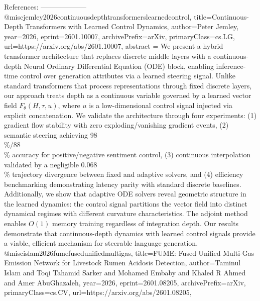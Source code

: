         References:
        --------------------
        @misc{jemley2026continuousdepthtransformerslearnedcontrol,
      title={Continuous-Depth Transformers with Learned Control Dynamics}, 
      author={Peter Jemley},
      year={2026},
      eprint={2601.10007},
      archivePrefix={arXiv},
      primaryClass={cs.LG},
      url={https://arxiv.org/abs/2601.10007},
      abstract = {We present a hybrid transformer architecture that replaces discrete middle layers with a continuous-depth Neural Ordinary Differential Equation (ODE) block, enabling inference-time control over generation attributes via a learned steering signal. Unlike standard transformers that process representations through fixed discrete layers, our approach treats depth as a continuous variable governed by a learned vector field $F_θ(H, τ, u)$, where $u$ is a low-dimensional control signal injected via explicit concatenation. We validate the architecture through four experiments: (1) gradient flow stability with zero exploding/vanishing gradient events, (2) semantic steering achieving 98\\\%/88\\\% accuracy for positive/negative sentiment control, (3) continuous interpolation validated by a negligible 0.068\\\% trajectory divergence between fixed and adaptive solvers, and (4) efficiency benchmarking demonstrating latency parity with standard discrete baselines. Additionally, we show that adaptive ODE solvers reveal geometric structure in the learned dynamics: the control signal partitions the vector field into distinct dynamical regimes with different curvature characteristics. The adjoint method enables $O(1)$ memory training regardless of integration depth. Our results demonstrate that continuous-depth dynamics with learned control signals provide a viable, efficient mechanism for steerable language generation.}
}@misc{islam2026fumefusedunifiedmultigas,
      title={FUME: Fused Unified Multi-Gas Emission Network for Livestock Rumen Acidosis Detection}, 
      author={Taminul Islam and Toqi Tahamid Sarker and Mohamed Embaby and Khaled R Ahmed and Amer AbuGhazaleh},
      year={2026},
      eprint={2601.08205},
      archivePrefix={arXiv},
      primaryClass={cs.CV},
      url={https://arxiv.org/abs/2601.08205},
}
